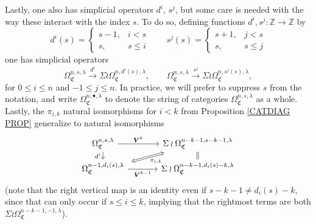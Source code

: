 \documentclass[a4paper,10pt
,draft
]{article}%
\numberwithin{equation}{section}
\numberwithin{figure}{section}
\theoremstyle{definition} %
\newcommand{\1}{\ensuremath{\mathbbm 1}}%
\begin{document}
Lastly, one also has simplicial operators $d^i$, $s^j$, 
but some care is needed with the way these interact with the index $s$. To do so, defining functions $d^i,s^j\colon \mathbb{Z} \to \mathbb{Z}$ by
\begin{equation}\label{SIMPLEXP EQ}
 d^i(s) = 
\begin{cases}
s-1, & i<s
\\
s, & s\leq i
\end{cases}
\qquad
s^j(s) = 
\begin{cases}
s+1, & j<s
\\
s, & s\leq j
\end{cases}
\end{equation}
one has simplicial operators
\[
\Omega_{\mathfrak{C}}^{n,s,\lambda} \xrightarrow{d^i} \Sigma \wr\Omega_{\mathfrak{C}}^{n,d^i(s),\lambda},
\qquad
\Omega_{\mathfrak{C}}^{n,s,\lambda} \xrightarrow{s^j} \Sigma \wr\Omega_{\mathfrak{C}}^{n,s^j(s),\lambda},
\]
for $0\leq i \leq n$ and $-1\leq j \leq n$.
In practice, we will prefer to suppress $s$ from the notation,
and write 
$\Omega_{\mathfrak{C}}^{n,\bullet,\lambda}$ to denote the string of categories 
$\Omega_{\mathfrak{C}}^{n,s,\lambda}$ as a whole.
Lastly, the $\pi_{i,k}$ natural isomorphisms for $i<k$ from Proposition \ref{CATDIAG PROP}
generalize to natural isomorphisms
\begin{equation}
\begin{tikzcd}[row sep = tiny, column sep = 35pt]
	\Omega_{\mathfrak{C}}^{n,s,\lambda}
	\arrow{r}{\boldsymbol{V}^k} \arrow{dd}[swap]{d^i} &
	|[alias=U]|
	 \Sigma \wr \Omega_{\mathfrak{C}}^{n-k-1,s-k-1,\lambda}
	 \ar[equal]{dd}{}
\\
\\
	|[alias=V]|
	\Omega_{\mathfrak{C}}^{n-1,d_i(s),\lambda} \arrow{r}[swap]{\boldsymbol{V}^{k-1}} &
	 \Sigma \wr \Omega_{\mathfrak{C}}^{n-k-1,d_i(s)-k,\lambda}
\arrow[Leftrightarrow, from=V, to=U,shorten >=0.15cm,shorten <=0.15cm
,swap,"\pi_{i,k}"
]
\end{tikzcd}
\end{equation}
(note that the right vertical map is an identity even if
$s-k-1 \neq d_i(s)-k$, since that can only occur if $s\leq i \leq k$, implying that the rightmost terms are both $\Sigma \wr \Omega_{\mathfrak{C}}^{n-k-1,-1,\lambda}$).
\end{document}
